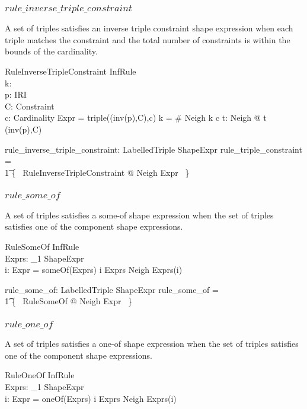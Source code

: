 \documentclass{article}
\begin{document}
\subsubsection{$rule\_inverse\_triple\_constraint$}
A set of triples satisfies an inverse triple constraint shape expression when each triple matches the constraint
and the total number of constraints is within the bounds of the cardinality.

\begin{schema}{RuleInverseTripleConstraint}
	InfRule \\
	k: \nat \\
	p: IRI \\
	C: Constraint \\
	c: Cardinality
\where
	Expr = triple((inv(p),C),c)
\also
	k = \# Neigh
\also
	k  c
\also
	\forall t: Neigh @ t  (inv(p),C)
\end{schema}

\begin{axdef}
	rule\_inverse\_triple\_constraint: \finset LabelledTriple \rel ShapeExpr
\where
	rule\_triple\_constraint = \\
\t1		\{~ RuleInverseTripleConstraint @ Neigh \mapsto Expr ~\}
\end{axdef}

\subsubsection{$rule\_some\_of$}
A set of triples satisfies a some-of shape expression when the set of triples satisfies one of the component
shape expressions.
\begin{schema}{RuleSomeOf}
	InfRule \\
	Exprs: \seq_1 ShapeExpr \\
	i: \nat
\where
	Expr = someOf(Exprs)
\also
	i \in \dom Exprs
\also
	Neigh  Exprs(i)
\end{schema}

\begin{axdef}
	rule\_some\_of: \finset LabelledTriple \rel ShapeExpr
\where
	rule\_some\_of = \\
\t1		\{~ RuleSomeOf @ Neigh \mapsto Expr ~\}
\end{axdef}

\subsubsection{$rule\_one\_of$}
A set of triples satisfies a one-of shape expression when the set of triples satisfies one of the component
shape expressions.
\begin{schema}{RuleOneOf}
	InfRule \\
	Exprs: \seq_1 ShapeExpr \\
	i: \nat
\where
	Expr = oneOf(Exprs)
\also
	i \in \dom Exprs
\also
	Neigh  Exprs(i)
\end{schema}
\end{document}
